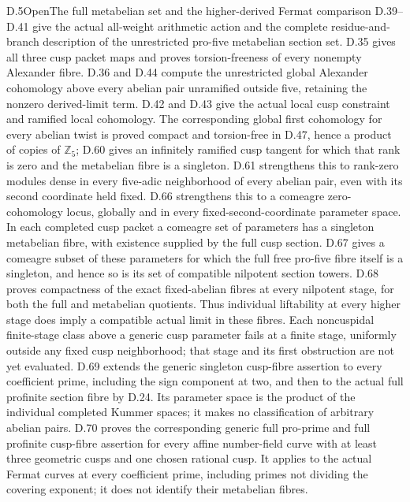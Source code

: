 \begin{statement}{D.5}{Open}{The full metabelian set and the higher-derived Fermat comparison}
D.39--D.41 give the actual all-weight arithmetic
action and the complete residue-and-branch
description of the unrestricted pro-five
metabelian section set. D.35 gives all three
cusp packet maps and proves torsion-freeness
of every nonempty Alexander fibre.
D.36 and D.44 compute the unrestricted global
Alexander cohomology above every abelian pair
unramified outside five, retaining the nonzero
derived-limit term. D.42 and D.43 give the
actual local cusp constraint and ramified
local cohomology. The corresponding global
first cohomology for every abelian twist
is proved compact and torsion-free in D.47,
hence a product of copies of \(\mathbb Z_5\);
D.60 gives an infinitely ramified cusp
tangent for which that rank is zero and
the metabelian fibre is a singleton. D.61
strengthens this to rank-zero modules dense
in every five-adic neighborhood of every
abelian pair, even with its second coordinate
held fixed. D.66 strengthens this to a comeagre
zero-cohomology locus, globally and in every
fixed-second-coordinate parameter space. In
each completed cusp packet a comeagre set
of parameters has a singleton metabelian
fibre, with existence supplied by the full
cusp section. D.67 gives a comeagre subset
of these parameters for which the full free
pro-five fibre itself is a singleton, and hence
so is its set of compatible nilpotent section
towers. D.68 proves compactness of the exact
fixed-abelian fibres at every nilpotent stage,
for both the full and metabelian quotients.
Thus individual liftability at every higher
stage does imply a compatible actual limit
in these fibres. Each noncuspidal finite-stage
class above a generic cusp parameter fails
at a finite stage, uniformly outside any
fixed cusp neighborhood; that stage and its
first obstruction are not yet evaluated.
D.69 extends the generic singleton cusp-fibre
assertion to every coefficient prime, including
the sign component at two, and then to the
actual full profinite section fibre by D.24.
Its parameter space is the product of the
individual completed Kummer spaces; it makes
no classification of arbitrary abelian pairs.
D.70 proves the corresponding generic full pro-prime
and full profinite cusp-fibre assertion for every
affine number-field curve with at least three geometric
cusps and one chosen rational cusp. It applies to
the actual Fermat curves at every coefficient prime,
including primes not dividing the covering exponent;
it does not identify their metabelian fibres.

\end{statement}
